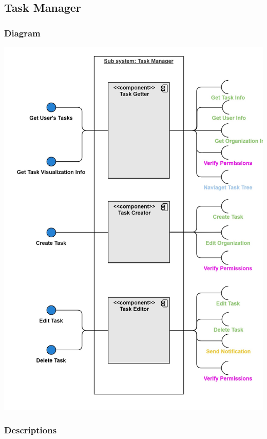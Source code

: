 \documentclass{article}
\begin{document}
\subsection{Task Manager}
\subsubsection{Diagram}
\begin{center}
    \includegraphics[width=5.5in,keepaspectratio]{images/component_diagram/task_manager.jpg}
\end{center}
\subsubsection{Descriptions}
\end{document}
